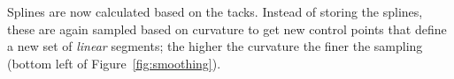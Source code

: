 Splines are now calculated based on the tacks.
Instead of storing the splines, these are again sampled based on curvature to get new control points that define a new set of \emph{linear} segments; the higher the curvature the finer the sampling (bottom left of Figure~\ref{fig:smoothing}).


% 

